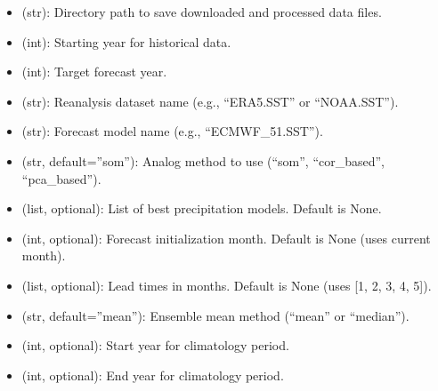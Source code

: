 \documentclass[letterpaper,10pt,english]{sphinxmanual}
\begin{document}
\sphinxAtStartPar
{}
\begin{itemize}
\item {} 
\sphinxAtStartPar
{} (str): Directory path to save downloaded and processed data files.

\item {} 
\sphinxAtStartPar
{} (int): Starting year for historical data.

\item {} 
\sphinxAtStartPar
{} (int): Target forecast year.

\item {} 
\sphinxAtStartPar
{} (str): Reanalysis dataset name (e.g., “ERA5.SST” or “NOAA.SST”).

\item {} 
\sphinxAtStartPar
{} (str): Forecast model name (e.g., “ECMWF\_51.SST”).

\item {} 
\sphinxAtStartPar
{} (str, default=”som”): Analog method to use (“som”, “cor\_based”, “pca\_based”).

\item {} 
\sphinxAtStartPar
{} (list, optional): List of best precipitation models. Default is None.

\item {} 
\sphinxAtStartPar
{} (int, optional): Forecast initialization month. Default is None (uses current month).

\item {} 
\sphinxAtStartPar
{} (list, optional): Lead times in months. Default is None (uses {[}1, 2, 3, 4, 5{]}).

\item {} 
\sphinxAtStartPar
{} (str, default=”mean”): Ensemble mean method (“mean” or “median”).

\item {} 
\sphinxAtStartPar
{} (int, optional): Start year for climatology period.

\item {} 
\sphinxAtStartPar
{} (int, optional): End year for climatology period.


\end{itemize}
\end{document}
